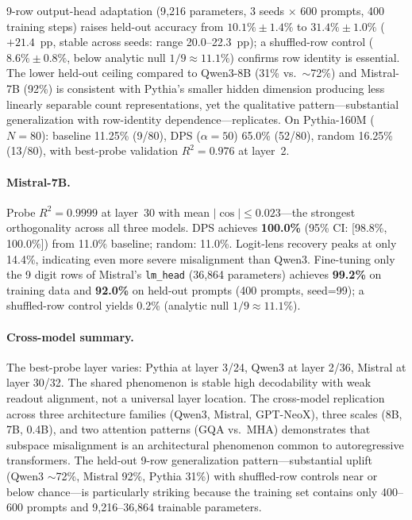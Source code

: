 \documentclass{article}
\begin{document}
9-row output-head adaptation (9{,}216 parameters, 3 seeds $\times$ 600 prompts, 400 training steps)
raises held-out accuracy from $10.1\% \pm 1.4\%$ to $\mathbf{31.4\% \pm 1.0\%}$
($+21.4$~pp, stable across seeds: range 20.0--22.3~pp);
a shuffled-row control ($8.6\% \pm 0.8\%$, below analytic null $1/9 \approx 11.1\%$)
confirms row identity is essential.
The lower held-out ceiling compared to Qwen3-8B (31\% vs.\ ${\sim}$72\%) and Mistral-7B
(92\%) is consistent with Pythia's smaller hidden dimension producing
less linearly separable count representations, yet the qualitative pattern---substantial
generalization with row-identity dependence---replicates.
On Pythia-160M ($N=80$): baseline 11.25\% (9/80), DPS ($\alpha=50$) 65.0\% (52/80), random 16.25\% (13/80), with best-probe validation $R^2=0.976$ at layer~2.

\paragraph{Mistral-7B.}
Probe $R^2 = 0.9999$ at layer~30 with mean $|\cos| \leq 0.023$---the strongest orthogonality across all three models.
DPS achieves \textbf{100.0\%} (95\% CI: [98.8\%, 100.0\%]) from 11.0\% baseline; random: 11.0\%.
Logit-lens recovery peaks at only 14.4\%, indicating even more severe misalignment than Qwen3.
Fine-tuning only the 9 digit rows of Mistral's \texttt{lm\_head} (36{,}864 parameters)
achieves \textbf{99.2\%} on training data and \textbf{92.0\%} on held-out prompts
(400 prompts, seed=99); a shuffled-row control yields 0.2\% (analytic null $1/9 \approx 11.1\%$).

\paragraph{Cross-model summary.}
The best-probe layer varies: Pythia at layer 3/24, Qwen3 at layer 2/36, Mistral at layer 30/32.
The shared phenomenon is stable high decodability with weak readout alignment, not a universal layer location.
The cross-model replication across three architecture families
(Qwen3, Mistral, GPT-NeoX), three scales (8B, 7B, 0.4B),
and two attention patterns (GQA vs.\ MHA) demonstrates that subspace misalignment
is an architectural phenomenon common to autoregressive transformers.
The held-out 9-row generalization pattern---substantial uplift (Qwen3 ${\sim}$72\%,
Mistral 92\%, Pythia 31\%) with shuffled-row controls near or below chance---is
particularly striking because the training set contains only 400--600 prompts and
9{,}216--36{,}864 trainable parameters.
\end{document}
